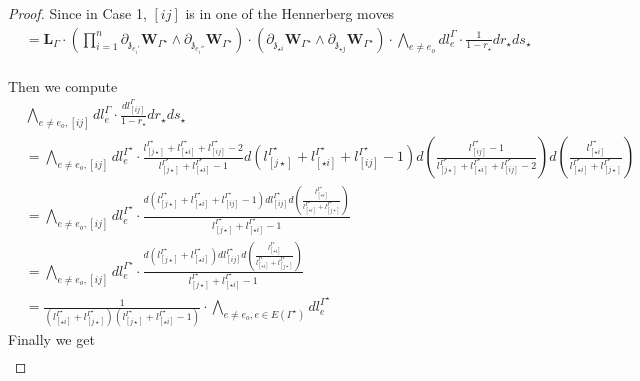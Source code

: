 \documentclass[11pt]{amsart}
\theoremstyle{definition}
\theoremstyle{remark}
\numberwithin{equation}{section}
\begin{document}
\begin{proof}
Since in Case 1, $[ij]$ is in one of the Hennerberg moves
\begin{align*}
   &=\mathbf{L}_{\Gamma}\cdot\left(\prod^n_{i=1}\partial_{\mathfrak{z}_{e_i'}}\mathbf{W}_{\Gamma^{\star}}\wedge\partial_{\mathfrak{z}_{e_i''}}\mathbf{W}_{\Gamma^{\star}}\right)\cdot  \left( \partial_{\mathfrak{z}_{\star i}}\mathbf{W}_{\Gamma^{\star}}\wedge \partial_{\mathfrak{z}_{\star j}}\mathbf{W}_{\Gamma^{\star}}\right)\cdot \bigwedge_{e\neq e_{o}}dl^{\Gamma}_{e}\cdot  \frac{1}{1- r_{\star}} dr_{\star}ds_{\star} \\
\end{align*}


Then we compute
\begin{align*}
   & \bigwedge_{e\neq e_{o},[ij]}dl^{\Gamma}_{e} \cdot \frac{dl^{\Gamma}_{[ij]}}{1-r_{\star}}dr_{\star}ds_{\star} \\
   & =\bigwedge_{e\neq e_{o},[ij]}dl^{\Gamma^{\star}}_{e} \cdot\frac{l^{\Gamma^\star}_{[ j\star]}+l^{\Gamma^\star}_{[ \star i]}+l^{\Gamma^\star}_{[ ij]}-2}{l^{\Gamma^\star}_{[ j\star]}+l^{\Gamma^\star}_{[ \star i]}-1}d(l^{\Gamma^\star}_{[ j\star]}+l^{\Gamma^\star}_{[ \star i]}+l^{\Gamma^\star}_{[ ij]}-1)d\left(\frac{l^{\Gamma^\star}_{[ ij]}-1}{l^{\Gamma^\star}_{[ j\star]}+l^{\Gamma^\star}_{[ \star i]}+l^{\Gamma^\star}_{[ ij]}-2}\right)d\left(\frac{l^{\Gamma^\star}_{[ \star i]}}{l^{\Gamma^\star}_{[ \star i]}+l^{\Gamma^\star}_{[ j\star ]}}\right)\\
   & =\bigwedge_{e\neq e_{o},[ij]}dl^{\Gamma^{\star}}_{e} \cdot\frac{d(l^{\Gamma^\star}_{[ j\star]}+l^{\Gamma^\star}_{[ \star i]}+l^{\Gamma^\star}_{[ ij]}-1)dl^{\Gamma^\star}_{[ ij]}d\left(\frac{l^{\Gamma^\star}_{[ \star i]}}{l^{\Gamma^\star}_{[ \star i]}+l^{\Gamma^\star}_{[ j\star ]}}\right)}{l^{\Gamma^\star}_{[ j\star]}+l^{\Gamma^\star}_{[ \star i]}-1}\\
   &=\bigwedge_{e\neq e_{o},[ij]}dl^{\Gamma^{\star}}_{e} \cdot\frac{d(l^{\Gamma^\star}_{[ j\star]}+l^{\Gamma^\star}_{[ \star i]})dl^{\Gamma^\star}_{[ ij]}d\left(\frac{l^{\Gamma^\star}_{[ \star i]}}{l^{\Gamma^\star}_{[ \star i]}+l^{\Gamma^\star}_{[ j\star ]}}\right)}{l^{\Gamma^\star}_{[ j\star]}+l^{\Gamma^\star}_{[ \star i]}-1}\\
      &= \frac{1}{(l^{\Gamma^\star}_{[ \star i]}+l^{\Gamma^\star}_{[ j\star ]})(l^{\Gamma^\star}_{[ j\star]}+l^{\Gamma^\star}_{[ \star i]}-1)}\cdot \bigwedge_{e\neq e_{o},e\in E(\Gamma^{\star})}dl^{\Gamma^{\star}}_{e}
\end{align*}
Finally we get
\begin{align*}

\end{align*}
\end{proof}
\end{document}
